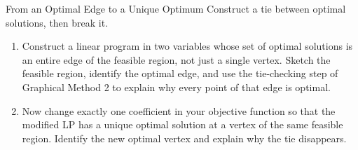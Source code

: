 \begin{ex}{From an Optimal Edge to a Unique Optimum}{}\label{ex:edge-of-optima}
Construct a tie between optimal solutions, then break it.
\begin{enumerate}
\item Construct a linear program in two variables whose set of optimal solutions is an entire edge of the feasible region, not just a single vertex. Sketch the feasible region, identify the optimal edge, and use the tie-checking step of Graphical Method 2 to explain why every point of that edge is optimal.
\item Now change exactly one coefficient in your objective function so that the modified LP has a unique optimal solution at a vertex of the same feasible region. Identify the new optimal vertex and explain why the tie disappears.
\end{enumerate}
\end{ex}

%

